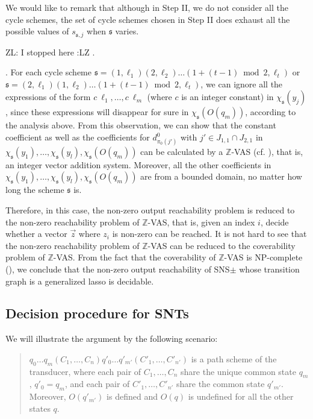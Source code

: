 \documentclass[runningheads,a4paper]{llncs}
\def\schm{{\mathfrak{s} }}
\newcommand\intnum{{\mathbb{Z} }}
\newcommand{\zhilin}[1]{\color{cyan} {ZL: #1 :LZ} \color{black}}
\begin{document}
We would like to remark that although in Step II, we do not consider all the cycle schemes, the set of cycle schemes chosen in Step II does exhaust all the possible values of $s_{\schm,j}$ when $\schm$ varies.


\zhilin{I stopped here}.

\smallskip

. For each cycle scheme $\schm=(1,\ell_1) (2,\ell_2) \dots (1+ (t-1) \bmod 2,\ell_t)$ or $\schm=(2,\ell_1) (1,\ell_2) \dots (1+ (t-1) \bmod 2,\ell_t)$, we can ignore all the expressions of the form $c\ \ell_1,\dots, c\ \ell_m$ (where $c$ is an integer constant) in $\chi_{\schm}(y_j)$, since these expressions will disappear for sure in $\chi_{\schm}(O(q_m))$, according to the analysis above. From this observation, we can show that the constant coefficient as well as the coefficients for $d^0_{\pi_0(j')}$ with $j' \in J_{1,1} \cap J_{2,1}$ in $\chi_{\schm}(y_1),\dots,\chi_{\schm}(y_l), \chi_{\schm}(O(q_m))$ can be calculated by a $\intnum$-VAS (cf. \cite{HH14}), that is, an integer vector addition system. Moreover, all the other coefficients in $\chi_{\schm}(y_1),\dots,\chi_{\schm}(y_l), \chi_{\schm}(O(q_m))$ are from a bounded domain, no matter how long the scheme $\schm$ is.  

Therefore, in this case, the non-zero output reachability problem is reduced to the non-zero reachability problem of $\intnum$-VAS, that is, given an index $i$, decide whether a vector $\vec{z}$ where $z_i$ is non-zero can be reached.  It is not hard to see that the non-zero reachability problem of $\intnum$-VAS can be reduced to the coverability problem of $\intnum$-VAS. From the fact that the coverability of $\intnum$-VAS is NP-complete (\cite{HH14}),  we conclude that the non-zero output reachability of SNS$\pm$ whose transition graph is a generalized lasso is decidable.



\subsection{Decision procedure for SNTs}

We will illustrate the argument by the following scenario:  
\begin{quote}
$q_0\dots q_{m} (C_1,\dots,C_n) q'_0 \dots q'_{m'} (C'_1,\dots,C'_{n'})$ is a path scheme of the transducer, where each pair of $C_1,\dots,C_n$ share the unique common state $q_m$, $q'_0 = q_m$, and each pair of $C'_1,\dots,C'_{n'}$ share the common state $q'_{m'}$. Moreover, $O(q'_{m'})$ is defined and $O(q)$ is undefined for all the other states $q$.
\end{quote}
\end{document}
